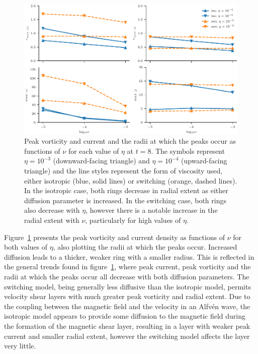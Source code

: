 \begin{figure}[h]
  \centering
  \includegraphics[width=\linewidth]{param_study/peak_mag_and_loc.pdf}
  \caption{Peak vorticity and current and the radii at which the peaks occur as functions of $\nu$ for each value of $\eta$ at $t=8$. The symbols represent $\eta=10^{-3}$ (downward-facing triangle) and $\eta=10^{-4}$ (upward-facing triangle) and the line styles represent the form of viscosity used, either isotropic (blue, solid lines) or switching (orange, dashed lines). In the isotropic case, both rings decrease in radial extent as either diffusion parameter is increased. In the switching case, both rings also decrease with $\eta$, however there is a notable increase in the radial extent with $\nu$, particularly for high values of $\eta$.}%
  \label{fig:param_study_peak_mag_and_loc}
\end{figure}

Figure~\ref{fig:param_study_peak_mag_and_loc} presents the peak vorticity and current density as functions of $\nu$ for both values of $\eta$, also plotting the radii at which the peaks occur. Increased diffusion leads to a thicker, weaker ring with a smaller radius. This is reflected in the general trends found in figure~\ref{fig:param_study_peak_mag_and_loc}, where peak current, peak vorticity and the radii at which the peaks occur all decrease with both diffusion parameters. The switching model, being generally less diffusive than the isotropic model, permits velocity shear layers with much greater peak vorticity and radial extent. Due to the coupling between the magnetic field and the velocity in an Alfv\'en wave, the isotropic model appears to provide some diffusion to the magnetic field during the formation of the magnetic shear layer, resulting in a layer with weaker peak current and smaller radial extent, however the switching model affects the layer very little.

